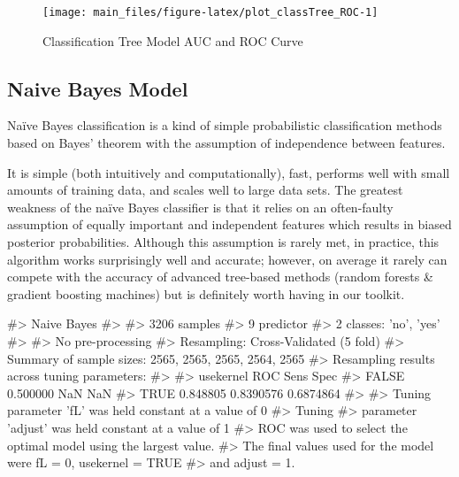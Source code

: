\begin{Schunk}
\begin{figure}[H]

{\centering \texttt{[image: main\_files/figure-latex/plot\_classTree\_ROC-1]} 

}

\caption[Classification Tree Model AUC and ROC Curve]{Classification Tree Model AUC and ROC Curve}\label{fig:plot_classTree_ROC}
\end{figure}
\end{Schunk}

\hypertarget{naive-bayes-model}{%
\subsection{Naive Bayes Model}\label{naive-bayes-model}}

Naïve Bayes classification is a kind of simple probabilistic
classification methods based on Bayes' theorem with the assumption of
independence between features.

It is simple (both intuitively and computationally), fast, performs well
with small amounts of training data, and scales well to large data sets.
The greatest weakness of the naïve Bayes classifier is that it relies on
an often-faulty assumption of equally important and independent features
which results in biased posterior probabilities. Although this
assumption is rarely met, in practice, this algorithm works surprisingly
well and accurate; however, on average it rarely can compete with the
accuracy of advanced tree-based methods (random forests \& gradient
boosting machines) but is definitely worth having in our toolkit.

\begin{Schunk}
\begin{Soutput}
#> Naive Bayes 
#> 
#> 3206 samples
#>    9 predictor
#>    2 classes: 'no', 'yes' 
#> 
#> No pre-processing
#> Resampling: Cross-Validated (5 fold) 
#> Summary of sample sizes: 2565, 2565, 2565, 2564, 2565 
#> Resampling results across tuning parameters:
#> 
#>   usekernel  ROC       Sens       Spec     
#>   FALSE      0.500000        NaN        NaN
#>    TRUE      0.848805  0.8390576  0.6874864
#> 
#> Tuning parameter 'fL' was held constant at a value of 0
#> Tuning
#>  parameter 'adjust' was held constant at a value of 1
#> ROC was used to select the optimal model using the largest value.
#> The final values used for the model were fL = 0, usekernel = TRUE
#>  and adjust = 1.
\end{Soutput}
\end{Schunk}

